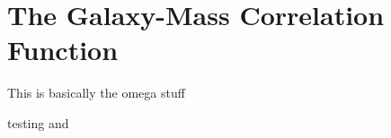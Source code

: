 \chapter{The Galaxy-Mass Correlation Function}

This is basically the omega stuff

testing \cite{Mckay02} and \citep{Blanton01}
